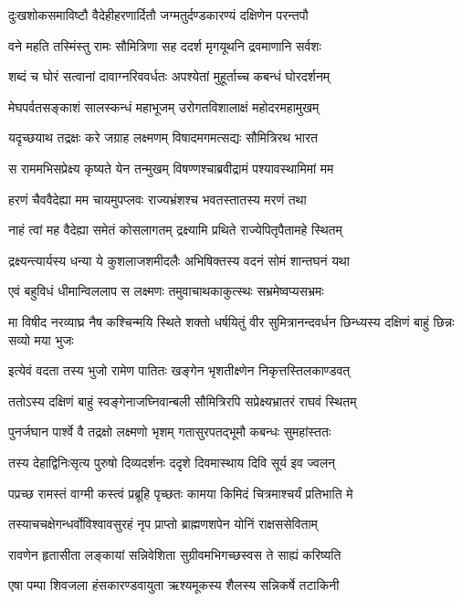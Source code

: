 \twolineshloka
{दुःखशोकसमाविष्टौ वैदेहीहरणार्दितौ}
{जग्मतुर्दण्डकारण्यं दक्षिणेन परन्तपौ}


\twolineshloka
{वने महति तस्मिंस्तु रामः सौमित्रिणा सह}
{ददर्श मृगयूथनि द्रवमाणानि सर्वशः}


\twolineshloka
{शब्दं च घोरं सत्वानां दावाग्नरिववर्धतः}
{अपश्येतां मुहूर्ताच्च कबन्धं घोरदर्शनम्}


\twolineshloka
{मेघपर्वतसङ्काशं सालस्कन्धं महाभूजम्}
{उरोगतविशालाक्षं महोदरमहामुखम्}


\twolineshloka
{यदृच्छयाथ तद्रक्षः करे जग्राह लक्ष्मणम्}
{विषादमगमत्सद्यः सौमित्रिरथ भारत}


\twolineshloka
{स राममभिसप्रेक्ष्य कृष्यते येन तन्मुखम्}
{विषण्णश्चाब्रवीद्रामं पश्यावस्थामिमां मम}


\twolineshloka
{हरणं चैववैदेह्या मम चायमुपप्लवः}
{राज्यभ्रंशश्च भवतस्तातस्य मरणं तथा}


\twolineshloka
{नाहं त्वां मह वैदेह्या समेतं कोसलागतम्}
{द्रक्ष्यामि प्रथिते राज्येपितृपैतामहे स्थितम्}


\twolineshloka
{द्रक्ष्यन्त्यार्यस्य धन्या ये कुशलाजशमीदलैः}
{अभिषिक्तस्य वदनं सोमं शान्तघनं यथा}


\twolineshloka
{एवं बहुविधं धीमान्विललाप स लक्ष्मणः}
{तमुवाचाथकाकुत्स्थः सभ्रमेष्वप्यसभ्रमः}


\threelineshloka
{मा विषीद नरव्याघ्र नैष कश्चिन्मयि स्थिते}
{शक्तो धर्षयितुं वीर सुमित्रानन्दवर्धन}
{छिन्ध्यस्य दक्षिणं बाहुं छिन्नः सव्यो मया भुजः}


\twolineshloka
{इत्येवं वदता तस्य भुजो रामेण पातितः}
{खङ्गेन भृशतीक्ष्णेन निकृत्तस्तिलकाण्डवत्}


\twolineshloka
{ततोऽस्य दक्षिणं बाहुं स्वङ्गेनाजघ्निवान्बली}
{सौमित्रिरपि सप्रेक्ष्यभ्रातरं राघवं स्थितम्}


\twolineshloka
{पुनर्जघान पार्श्वे वै तद्रक्षो लक्ष्मणो भृशम्}
{गतासुरपतद्भूमौ कबन्धः सुमहांस्ततः}


\twolineshloka
{तस्य देहाद्विनिःसृत्य पुरुषो दिव्यदर्शनः}
{ददृशे दिवमास्थाय दिवि सूर्य इव ज्वलन्}


\twolineshloka
{पप्रच्छ रामस्तं वाग्मी कस्त्वं प्रब्रूहि पृच्छतः}
{कामया किमिदं चित्रमाश्चर्यं प्रतिभाति मे}


\twolineshloka
{तस्याचचक्षेगन्धर्वोविश्वावसुरहं नृप}
{प्राप्तो ब्राह्मणशपेन योनिं राक्षससेविताम्}


\twolineshloka
{रावणेन हृतासीता लङ्कायां सन्निवेशिता}
{सुग्रीवमभिगच्छस्वस ते साह्यं करिष्यति}


\twolineshloka
{एषा पम्पा शिवजला हंसकारण्डवायुता}
{ऋश्यमूकस्य शैलस्य सन्निकर्षे तटाकिनी}


